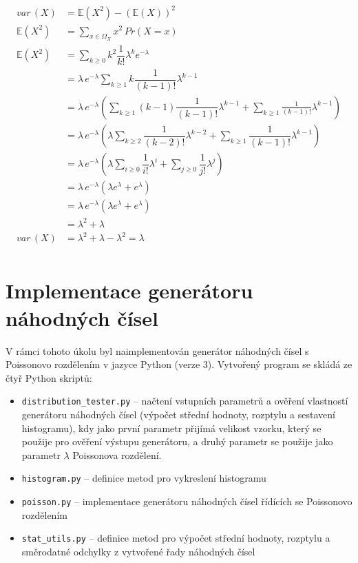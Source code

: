 \documentclass[12pt, a4paper]{article}
\let\oldsection\section
\renewcommand\section{\clearpage\oldsection}
\begin{document}
    \begin{equation}
        \label{variance}
        \begin{split}
            var\,(X) & = \mathbb{E} (X^2) - (\mathbb{E} (X))^2 \\
            \mathbb{E} (X^2) &= \sum_{x \mathop \in \Omega_{X}} x^2 \, Pr(X = x) \\
            \mathbb{E} (X^2) &= \sum_{k \mathop \ge 0} {k^2 \dfrac 1 {k!} \lambda^k e^{-\lambda} } \\
            & = \lambda\, e^{-\lambda} \sum_{k \mathop \ge 1} {k \dfrac 1 {(k - 1)!} \lambda^{k - 1} } \\
            & = \lambda\, e^{-\lambda} ( \sum_{k \mathop \ge 1} {(k - 1) \dfrac 1 {(k - 1)!} \lambda^{k - 1} } + \sum_{k \mathop \ge 1} {\frac 1 {(k - 1)!} \lambda^{k - 1} }  ) \\
            & = \lambda\, e^{-\lambda} ( \lambda \sum_{k \mathop \ge 2} {\dfrac 1 {(k - 2)!} \lambda^{k - 2} } + \sum_{k \mathop \ge 1} {\dfrac 1 {(k - 1)!} \lambda^{k - 1} } ) \\
            & = \lambda\, e^{-\lambda} ( \lambda \sum_{i \mathop \ge 0} {\dfrac 1 {i!} \lambda^i} + \sum_{j \mathop \ge 0} {\dfrac 1 {j!} \lambda^j} ) \\
            & = \lambda\, e^{-\lambda} ( \lambda e^\lambda + e^\lambda) \\
            & = \lambda\, e^{-\lambda} ( \lambda e^\lambda + e^\lambda) \\
            & = \lambda^2 + \lambda \\
            var\,(X) & = \lambda^{2} + \lambda - \lambda^{2} = \lambda \\
        \end{split}
    \end{equation}


    \section{Implementace generátoru náhodných čísel}

    V rámci tohoto úkolu byl naimplementován generátor náhodných čísel s Poissonovo rozdělením v jazyce Python (verze 3).
    Vytvořený program se skládá ze čtyř Python skriptů:
    \begin{itemize}
        \item \texttt{distribution\_tester.py} -- načtení vstupních parametrů a ověření vlastností generátoru náhodných čísel (výpočet střední hodnoty, rozptylu a sestavení histogramu),
        kdy jako první parametr přijímá velikost vzorku, který se použije pro ověření výstupu generátoru, a druhý parametr
        se použije jako parametr $\lambda$ Poissonova rozdělení.
        \item \texttt{histogram.py} -- definice metod pro vykreslení histogramu
        \item \texttt{poisson.py} -- implementace generátoru náhodných čísel řídících se Poissonovo rozdělením
        \item \texttt{stat_utils.py} -- definice metod pro výpočet střední hodnoty, rozptylu a směrodatné odchylky z vytvořené řady náhodných čísel
    \end{itemize}
\end{document}
